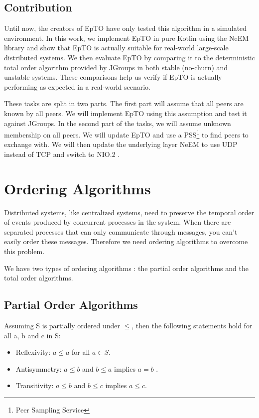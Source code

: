 \documentclass[10pt,conference,a4paper]{IEEEtran}
\begin{document}
\subsection{Contribution}
Until now, the creators of EpTO have only tested this algorithm in a simulated environment. In this work, we implement EpTO in pure Kotlin using the NeEM library \autocite{neem} and show that EpTO is actually suitable for real-world large-scale distributed systems. We then evaluate EpTO by comparing it to the deterministic total order algorithm provided by JGroups  \autocite{jgroups} in both stable (no-churn) and unstable systems. These comparisons help us verify if EpTO is actually performing as expected in a real-world scenario.
\par
These tasks are split in two parts. The first part will assume that all peers are known by all peers. We will implement EpTO using this assumption and test it against JGroups. In the second part of the tasks, we will assume unknown membership on all peers. We will update EpTO and use a PSS\footnote{Peer Sampling Service} to find peers to exchange with. We will then update the underlying layer NeEM to use UDP instead of TCP and switch to NIO.2 \autocite{nio}.

\section{Ordering Algorithms}
Distributed systems, like centralized systems, need to preserve the temporal order of events produced by concurrent processes in the system. When there are separated processes that can only communicate through messages, you can’t easily order these messages.
Therefore we need ordering algorithms to overcome this problem.
\par
We have two types of ordering algorithms \autocite{lamport1978time}: the partial order algorithms and the total order algorithms.
\subsection{Partial Order Algorithms}
Assuming S is partially ordered under $\leq$, then the following statements hold for all a, b and c in S:
\begin{itemize}
	\item Reflexivity: $a \leq a$ for all $a \in S$.
	\item Antisymmetry: $a \leq b$ and $b \leq a$ implies $a=b$ .
	\item Transitivity: $a \leq b$  and $b \leq c$  implies $a \leq c$.
\end{itemize}
\end{document}
